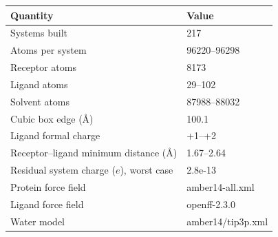 \begin{tabular}{ll}
\toprule
Quantity & Value \\
\midrule
Systems built & 217 \\
Atoms per system & 96220--96298 \\
Receptor atoms & 8173 \\
Ligand atoms & 29--102 \\
Solvent atoms & 87988--88032 \\
Cubic box edge (\AA) & 100.1 \\
Ligand formal charge & +1--+2 \\
Receptor--ligand minimum distance (\AA) & 1.67--2.64 \\
Residual system charge ($e$), worst case & 2.8e-13 \\
Protein force field & amber14-all.xml \\
Ligand force field & openff-2.3.0 \\
Water model & amber14/tip3p.xml \\
\bottomrule
\end{tabular}
